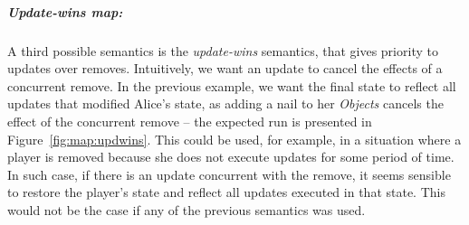 \documentclass[11pt,a4paper]{article}
\begin{document}
\subparagraph{Update-wins map:}

A third possible semantics is the \emph{update-wins} semantics, that gives
priority to updates over removes. 
Intuitively, we want an update to cancel the effects of a concurrent remove. 
In the previous example, we want the final state to reflect all updates that 
modified Alice's state, as adding a nail to her \emph{Objects} cancels the effect 
of the concurrent remove -- the expected run is presented in Figure~\ref{fig:map:updwins}.
This could be used, for example, in a situation where a player is removed because she 
does not execute updates for some period of time. 
In such case, if there is an update concurrent with the remove, it seems sensible
to restore the player's state and reflect all updates executed in that state. 
This would not be the case if any of the previous semantics was used.

\end{document}
